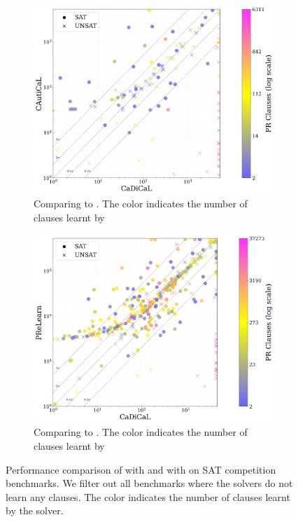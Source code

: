 \begin{figure}[!t]
    \centering
    \begin{subfigure}[t]{0.45\textwidth}
        \centering
        \includegraphics[width=\textwidth]{figs/cadical_vs_cautical_nontrivial.jpg}
        \caption{Comparing \tool to \cadical. The color indicates the number of \pr clauses learnt by \tool}
        \label{fig:cautical-vs-cadical}
    \end{subfigure}
    \hspace{0.06\textwidth}
    \begin{subfigure}[t]{0.45\textwidth}
        \centering
        \includegraphics[width=\textwidth]{figs/cadical_vs_prelearn_nontrivial.jpg}
        \caption{Comparing \prelearn to \cadical. The color indicates the number of \pr clauses learnt by \prelearn}
        \label{fig:cautical-vs-prelearn}
    \end{subfigure}
    \caption{Performance comparison of \tool with and \prelearn with \cadical on SAT competition benchmarks. We filter out all benchmarks where the solvers do not learn any \pr clauses. The color indicates the number of \pr clauses learnt by the solver.}
    \label{fig:solver-comparison}
\end{figure}

